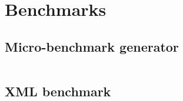 \chapter{Benchmarks}
\label{chap:benchmarks}

\section{Micro-benchmark generator}
\inputminted{racket}{listings/comp.rkt}

\section{XML benchmark}
\inputminted{racket}{listings/xml.rkt}
